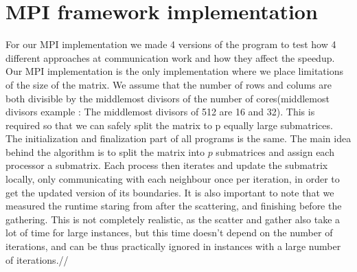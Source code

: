 \documentclass[11pt]{article}
\begin{document}
\section{MPI framework implementation}
For our MPI implementation we made 4 versions of the program to test how 4 different approaches at communication work and how they affect the speedup.
Our MPI implementation is the only implementation where we place limitations of the size of the matrix. We assume that the number of rows and colums
are both divisible by the middlemost divisors of the number of cores(middlemost divisors example : The middlemost divisors of 512 are
16 and 32). This is required so that we can safely split the matrix to p equally large submatrices.
The initialization and finalization part of all programs is the same. The main idea behind the algorithm is to split the matrix into $p$ submatrices and assign
each processor a submatrix. Each process then iterates and update the submatrix locally, only communicating with each neighbour once per iteration, in order to
get the updated version of its boundaries. It is also important to note that we measured the runtime staring from after the scattering, and finishing before the gathering.
This is not completely realistic, as the scatter and gather also take a lot of time for large instances, but this time doesn't depend on the number of iterations, and can be thus
practically ignored in instances with a large number of iterations.//
\end{document}
